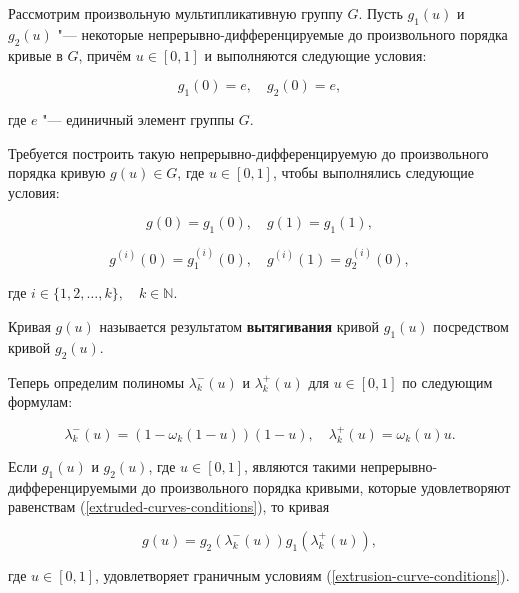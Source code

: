 Рассмотрим произвольную мультипликативную группу $G$. Пусть $g_1(u)$ и $g_2(u)$ "--- некоторые
непрерывно-дифференцируемые до произвольного порядка кривые в $G$, причём $u \in [0,1]$ и выполняются следующие условия:

\begin{equation}
g_1(0)=e, \quad g_2(0)=e,
\label{extruded-curves-conditions}
\end{equation}

\noindent где $e$ "--- единичный элемент группы $G$.

Требуется построить такую непрерывно-дифференцируемую до произвольного порядка кривую $g(u)\in G$, где $u \in [0,1]$,
чтобы выполнялись следующие условия:

$$
g(0)=g_1(0), \quad g(1)=g_1(1),
$$

\begin{equation}
g^{(i)}(0)=g_1^{(i)}(0), \quad g^{(i)}(1)=g_2^{(i)}(0),
\label{extrusion-curve-conditions}
\end{equation}

\noindent где $i \in \{1,2,\dots,k\},\quad k\in\mathbb{N}$.

\begin{definition}
Кривая $g(u)$ называется результатом \textbf{вытягивания} кривой $g_1(u)$ посредством кривой $g_2(u)$.
\end{definition}

Теперь определим полиномы $\lambda_k^-(u)$ и $\lambda_k^+(u)$ для $u \in [0,1]$ по следующим формулам:

$$
\lambda_k^-(u)=(1-\omega_k(1-u))(1-u), \quad \lambda_k^+(u)=\omega_k(u)u.
$$

\begin{theorem}
Если $g_1(u)$ и $g_2(u)$, где $u \in [0,1]$, являются такими непрерывно-дифференцируемыми до произвольного порядка
кривыми, которые удовлетворяют равенствам (\ref{extruded-curves-conditions}), то кривая

$$
g(u)=g_2(\lambda_k^-(u))g_1(\lambda_k^+(u)),
$$

\noindent где $u \in [0,1]$, удовлетворяет граничным условиям (\ref{extrusion-curve-conditions}).
\end{theorem}
